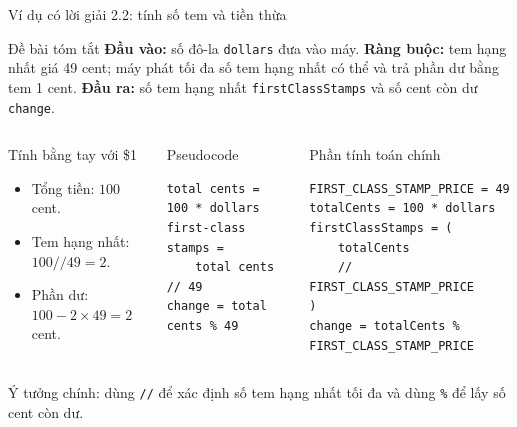 \documentclass[aspectratio=169,10pt]{beamer}
\begin{document}
\begin{frame}[fragile]{Ví dụ có lời giải 2.2: tính số tem và tiền thừa}
\small
\begin{block}{Đề bài tóm tắt}
\textbf{Đầu vào:} số đô-la \texttt{dollars} đưa vào máy. \quad
\textbf{Ràng buộc:} tem hạng nhất giá 49 cent; máy phát tối đa số tem hạng nhất có thể và trả phần dư bằng tem 1 cent. \quad
\textbf{Đầu ra:} số tem hạng nhất \texttt{firstClassStamps} và số cent còn dư \texttt{change}.
\end{block}

\vspace{0.12cm}
\begin{columns}[T,onlytextwidth]
\begin{block}{Tính bằng tay với \$1}
\begin{itemize}
  \item Tổng tiền: $100$ cent.
  \item Tem hạng nhất: $100 // 49 = 2$.
  \item Phần dư: $100 - 2\times49 = 2$ cent.
\end{itemize}
\end{block}

\begin{block}{Pseudocode}
\begin{lstlisting}[basicstyle=\ttfamily\tiny]
total cents = 100 * dollars
first-class stamps =
    total cents // 49
change = total cents % 49
\end{lstlisting}
\end{block}

\begin{block}{Phần tính toán chính}
\begin{lstlisting}[basicstyle=\ttfamily\tiny]
FIRST_CLASS_STAMP_PRICE = 49
totalCents = 100 * dollars
firstClassStamps = (
    totalCents
    // FIRST_CLASS_STAMP_PRICE
)
change = totalCents % FIRST_CLASS_STAMP_PRICE
\end{lstlisting}
\end{block}
\end{columns}

\vspace{0.08cm}
\begin{center}
\scriptsize Ý tưởng chính: dùng \texttt{//} để xác định số tem hạng nhất tối đa và dùng \texttt{\%} để lấy số cent còn dư.
\end{center}
\end{frame}
\end{document}
